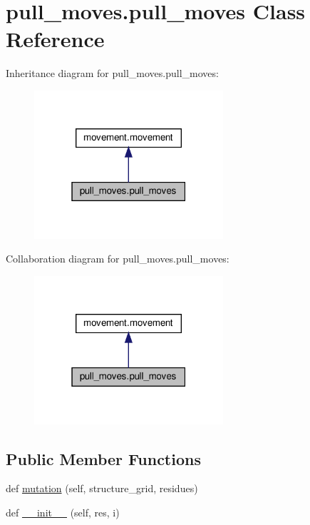 \hypertarget{classpull__moves_1_1pull__moves}{}\section{pull\+\_\+moves.\+pull\+\_\+moves Class Reference}
\label{classpull__moves_1_1pull__moves}


Inheritance diagram for pull\+\_\+moves.\+pull\+\_\+moves\+:
\nopagebreak
\begin{figure}[H]
\begin{center}
\leavevmode
\includegraphics[width=199pt]{classpull__moves_1_1pull__moves__inherit__graph}
\end{center}
\end{figure}


Collaboration diagram for pull\+\_\+moves.\+pull\+\_\+moves\+:
\nopagebreak
\begin{figure}[H]
\begin{center}
\leavevmode
\includegraphics[width=199pt]{classpull__moves_1_1pull__moves__coll__graph}
\end{center}
\end{figure}
\subsection*{Public Member Functions}
\begin{DoxyCompactItemize}
\item 
def \hyperlink{classpull__moves_1_1pull__moves_a2322051e5c24802bdcda8604e7a00b20}{mutation} (self, structure\+\_\+grid, residues)
\item 
def \hyperlink{classpull__moves_1_1pull__moves_a0877c3a2c3818eecdf3622ea01acf714}{\+\_\+\+\_\+init\+\_\+\+\_\+} (self, res, i)
\end{DoxyCompactItemize}
